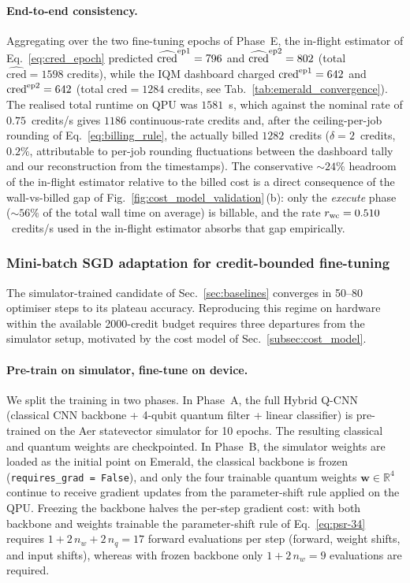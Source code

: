 \paragraph{End-to-end consistency.}
Aggregating over the two fine-tuning epochs of Phase~E, the in-flight
estimator of Eq.~\eqref{eq:cred_epoch} predicted
$\widehat{\mathrm{cred}}^{\rm ep1}=796$ and $\widehat{\mathrm{cred}}^{\rm ep2}=802$
(total $\widehat{\mathrm{cred}}=1598$ credits), while the IQM dashboard charged
$\mathrm{cred}^{\rm ep1}=642$ and $\mathrm{cred}^{\rm ep2}=642$ (total
$\mathrm{cred}=1284$ credits, see Tab.~\ref{tab:emerald_convergence}). The
realised total runtime on QPU was $1581$~s, which against the nominal rate of
$0.75$~credits/s gives $1186$ continuous-rate credits and, after the
ceiling-per-job rounding of Eq.~\eqref{eq:billing_rule}, the actually billed
$1282$~credits ($\delta=2$~credits, $0.2\%$, attributable to per-job rounding
fluctuations between the dashboard tally and our reconstruction from the
timestamps). The conservative $\sim\!24\%$ headroom of the in-flight estimator
relative to the billed cost is a direct consequence of the wall-vs-billed gap
of Fig.~\ref{fig:cost_model_validation}\,(b): only the \emph{execute} phase
($\sim\!56\%$ of the total wall time on average) is billable, and the rate
$r_{\rm wc}=0.510$~credits/s used in the in-flight estimator absorbs that
gap empirically.

\subsubsection{Mini-batch SGD adaptation for credit-bounded fine-tuning}
\label{subsec:minibatch_sgd}

The simulator-trained candidate of Sec.~\ref{sec:baselines} converges in 50--80 optimiser steps to its plateau accuracy. Reproducing this regime on hardware within the available 2000-credit budget requires three departures from the simulator setup, motivated by the cost model of Sec.~\ref{subsec:cost_model}.

\paragraph{Pre-train on simulator, fine-tune on device.}
We split the training in two phases. In Phase~A, the full Hybrid Q-CNN (classical CNN backbone + 4-qubit quantum filter + linear classifier) is pre-trained on the Aer statevector simulator for 10 epochs. The resulting classical and quantum weights are checkpointed. In Phase~B, the simulator weights are loaded as the initial point on Emerald, the classical backbone is frozen (\texttt{requires\_grad = False}), and only the four trainable quantum weights $\boldsymbol{w}\in\mathbb{R}^4$ continue to receive gradient updates from the parameter-shift rule applied on the QPU. Freezing the backbone halves the per-step gradient cost: with both backbone and weights trainable the parameter-shift rule of Eq.~\ref{eq:psr-34} requires $1+2\,n_w+2\,n_q=17$ forward evaluations per step (forward, weight shifts, and input shifts), whereas with frozen backbone only $1+2\,n_w=9$ evaluations are required.


